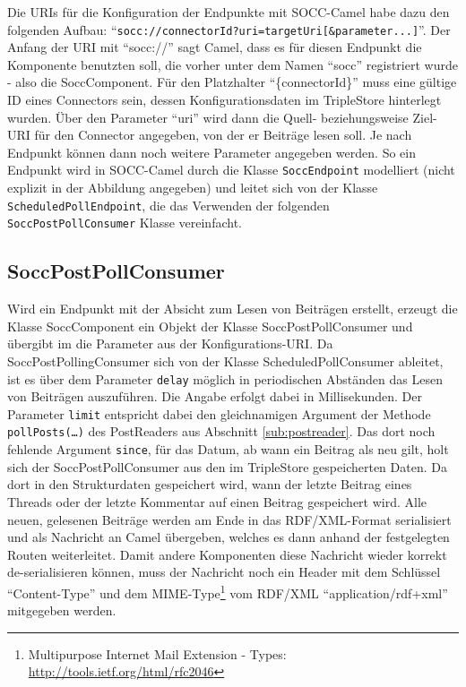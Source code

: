 Die URIs für die Konfiguration der Endpunkte mit SOCC-Camel habe dazu den folgenden Aufbau: \enquote{\texttt{socc://{connectorId}?uri={targetUri}[\&{parameter}...]}}. Der Anfang der URI mit \enquote{socc://} sagt Camel, dass es für diesen Endpunkt die Komponente benutzten soll, die vorher unter dem Namen \enquote{socc} registriert wurde - also die SoccComponent. Für den Platzhalter \enquote{\{connectorId\}} muss eine gültige ID eines Connectors sein, dessen Konfigurationsdaten im TripleStore hinterlegt wurden. Über den Parameter \enquote{uri} wird dann die Quell- beziehungsweise Ziel-URI für den Connector angegeben, von der er Beiträge lesen soll. Je nach Endpunkt können dann noch weitere Parameter angegeben werden. So ein Endpunkt wird in SOCC-Camel durch die Klasse \texttt{SoccEndpoint} modelliert (nicht explizit in der Abbildung angegeben) und leitet sich von der Klasse \texttt{ScheduledPollEndpoint}, die das Verwenden der folgenden \texttt{SoccPostPollConsumer} Klasse vereinfacht.

\subsection{SoccPostPollConsumer} %
\label{sub:soccpostpollingconsumer}

Wird ein Endpunkt mit der Absicht zum Lesen von Beiträgen erstellt, erzeugt die Klasse SoccComponent ein Objekt der Klasse SoccPostPollConsumer und übergibt im die Parameter aus der Konfigurations-URI. Da SoccPostPollingConsumer sich von der Klasse ScheduledPollConsumer ableitet, ist es über dem Parameter \texttt{delay} möglich in periodischen Abständen das Lesen von Beiträgen auszuführen. Die Angabe erfolgt dabei in Millisekunden. Der Parameter \texttt{limit} entspricht dabei den gleichnamigen Argument der Methode \texttt{pollPosts(\dots)} des PostReaders aus Abschnitt \ref{sub:postreader}. Das dort noch fehlende Argument \texttt{since}, für das Datum, ab wann ein Beitrag als neu gilt, holt sich der SoccPostPollConsumer aus den im TripleStore gespeicherten Daten. Da dort in den Strukturdaten gespeichert wird, wann der letzte Beitrag eines Threads oder der letzte Kommentar auf einen Beitrag gespeichert wird. Alle neuen, gelesenen Beiträge werden am Ende in das RDF/XML-Format serialisiert und als Nachricht an Camel übergeben, welches es dann anhand der festgelegten Routen weiterleitet. Damit andere Komponenten diese Nachricht wieder korrekt de-serialisieren können, muss der Nachricht noch ein Header mit dem Schlüssel \enquote{Content-Type} und dem MIME-Type\footnote{ Multipurpose Internet Mail Extension - Types: \url{http://tools.ietf.org/html/rfc2046}} vom RDF/XML \enquote{application/rdf+xml} mitgegeben werden.

